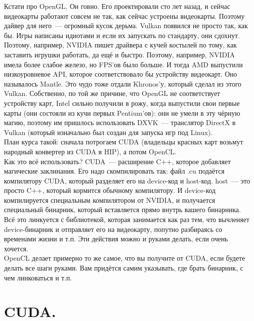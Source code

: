 \documentclass{article}
\begin{document}
    Кстати про OpenGL. Он говно. Его проектировали сто лет назад, и сейчас видеокарты работают совсем не так, как сейчас устроены видеокарты. Поэтому дайвер для него~--- огромный кусок дерьма. Vulkan появился не просто так, как бы. Игры написаны идиотами и если их запускать по стандарту, они сдохнут. Поэтому, например, NVIDIA пишет драйвера с кучей костылей по тому, как заставить игрушки работать, да ещё и быстро. Поэтому, например, NVIDIA имела более слабое железо, но FPS'ов было больше. И тогда AMD выпустили низкоуровневое API, которое соответствовало бы устройству видеокарт. Оно называлось Mantle. Это чудо тоже отдали Khronos'у, который сделал из этого Vulkan. Собственно, по той же причине, что OpenGL не соответствует устройству карт, Intel сильно получили в рожу, когда выпустили свои первые карты (они состояли из кучи первых Pentium'ов): они не умели в эту чёрную магию, поэтому им пришлось использовать DXVK~--- транслятор DirectX в Vulkan (который изначально был создан для запуска игр под Linux).\\
    План курса такой: сначала потрогаем CUDA (владельцы красных карт возьмут народный конвертер из CUDA в HIP), а потом OpenCL.\\
    Как это всё использовать? CUDA~--- расширение C++, которое добавляет магические заклинания. Его надо скомпилировать так: файл .cu подаётся компилятору CUDA, который разделяет его на device-код и host-код. host~--- это просто C++, который кормится обычному компилятору. И device-код компилируется специальным компилятором от NVIDIA, и получается специальный бинарник, который вставляется прямо внутрь вашего бинарника. Всё это линкуется с библиотекой, которая занимается как раз тем, что вычленяет device-бинарник и отправляет его на видеокарту, попутно разбираясь со временами жизни и т.п. Эти действия можно и руками делать, если очень хочется.\\
    OpenCL делает примерно то же самое, что вы получите от CUDA, если будете делать все шаги руками. Вам придётся самим указывать, где брать бинарник, с чем линковаться и т.п.
    \section{CUDA.}
\end{document}

